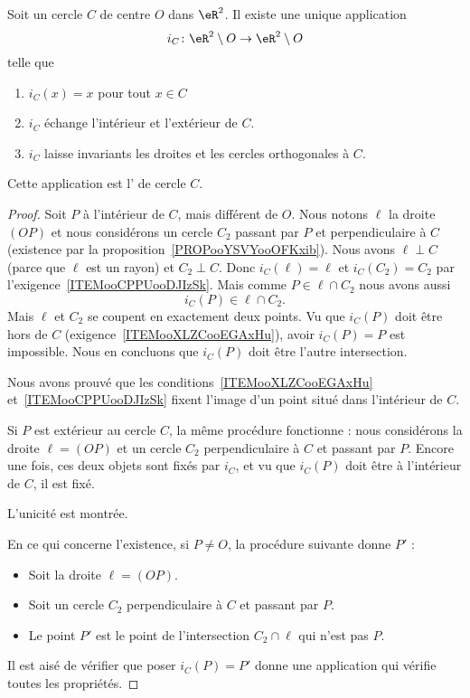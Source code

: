 \begin{propositionDef}       \label{PROPDEFooVLIWooQgpLQa}
	Soit un cercle \( C\) de centre \( O\) dans \( \eR^2\). Il existe une unique application
	\begin{equation}
		i_C\colon \eR^2\setminus O\to \eR^2\setminus O
	\end{equation}
	telle que
	\begin{enumerate}
		\item
		      \( i_C(x)=x\) pour tout \( x\in C\)
		\item\label{ITEMooXLZCooEGAxHu}
		      \( i_C\) échange l'intérieur et l'extérieur de \( C\).
		\item\label{ITEMooCPPUooDJIzSk}
		      \( i_C\) laisse invariants les droites et les cercles orthogonales à \( C\).
	\end{enumerate}
	Cette application est l' de cercle \( C\).
\end{propositionDef}

\begin{proof}
	Soit \( P\) à l'intérieur de \( C\), mais différent de \( O\). Nous notons \( \ell\) la droite \( (OP)\) et nous considérons un cercle \( C_2\) passant par \( P\) et perpendiculaire à \( C\) (existence par la proposition~\ref{PROPooYSVYooOFKxib}). Nous avons \( \ell\perp C\) (parce que \( \ell\) est un rayon) et \( C_2\perp C\). Donc \( i_C(\ell)=\ell\) et \( i_C(C_2)=C_2\) par l'exigence~\ref{ITEMooCPPUooDJIzSk}. Mais comme \( P\in\ell\cap C_2 \) nous avons aussi
	\begin{equation}
		i_C(P)\in \ell\cap C_2.
	\end{equation}
	Mais \( \ell\) et \( C_2\) se coupent en exactement deux points. Vu que \( i_C(P)\) doit être hors de \( C\) (exigence~\ref{ITEMooXLZCooEGAxHu}), avoir \( i_C(P)=P\) est impossible. Nous en concluons que \( i_C(P)\) doit être l'autre intersection.

	Nous avons prouvé que les conditions~\ref{ITEMooXLZCooEGAxHu} et~\ref{ITEMooCPPUooDJIzSk} fixent l'image d'un point situé dans l'intérieur de \( C\).

	Si \( P\) est extérieur au cercle $C$, la même procédure fonctionne : nous considérons la droite \( \ell=(OP)\) et un cercle \( C_2\) perpendiculaire à \( C\) et passant par \( P\). Encore une fois, ces deux objets sont fixés par \( i_C\), et vu que \( i_C(P)\) doit être à l'intérieur de \( C\), il est fixé.

	L'unicité est montrée.

	En ce qui concerne l'existence, si \( P\neq O\), la procédure suivante donne \( P'\) :
	\begin{itemize}
		\item Soit la droite \( \ell=(OP)\).
		\item Soit un cercle \( C_2\) perpendiculaire à \( C\) et passant par \( P\).
		\item Le point \( P'\) est le point de l'intersection \( C_2\cap\ell\) qui n'est pas \( P\).
	\end{itemize}
	Il est aisé de vérifier que poser \( i_C(P)=P'\) donne une application qui vérifie toutes les propriétés.
\end{proof}

